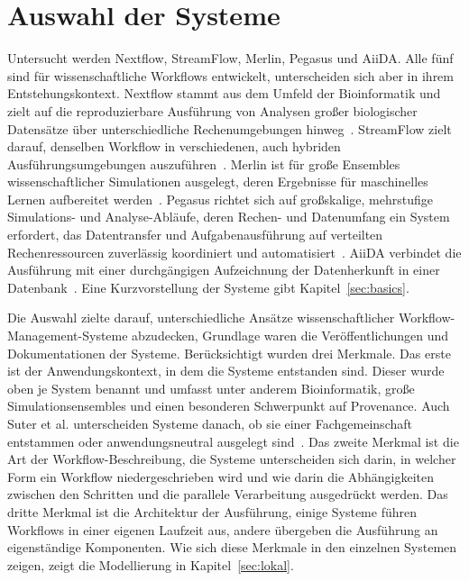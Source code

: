 \section{Auswahl der Systeme}
\label{sec:methodik:auswahl}
Untersucht werden Nextflow, StreamFlow, Merlin, Pegasus und AiiDA. Alle fünf sind für wissenschaftliche Workflows entwickelt, unterscheiden sich aber in ihrem Entstehungskontext. Nextflow stammt aus dem Umfeld der Bioinformatik und zielt auf die reproduzierbare Ausführung von Analysen großer biologischer Datensätze über unterschiedliche Rechenumgebungen hinweg~\cite[S.~316]{ditommaso2017nextflow}. StreamFlow zielt darauf, denselben Workflow in verschiedenen, auch hybriden Ausführungsumgebungen auszuführen~\cite[S.~1723]{colonnelli2021streamflow}. Merlin ist für große Ensembles wissenschaftlicher Simulationen ausgelegt, deren Ergebnisse für maschinelles Lernen aufbereitet werden~\cite[S.~255]{peterson2022merlin}. Pegasus richtet sich auf großskalige, mehrstufige Simulations- und Analyse-Abläufe, deren Rechen- und Datenumfang ein System erfordert, das Datentransfer und Aufgabenausführung auf verteilten Rechenressourcen zuverlässig koordiniert und automatisiert~\cite[S.~17]{deelman2015pegasus}. AiiDA verbindet die Ausführung mit einer durchgängigen Aufzeichnung der Datenherkunft in einer Datenbank~\cite[S.~1]{huber2020aiida}. Eine Kurzvorstellung der Systeme gibt Kapitel~\ref{sec:basics}.

\begin{sloppypar}
Die Auswahl zielte darauf, unterschiedliche Ansätze
wissenschaftlicher Workflow-Management-Systeme abzudecken, Grundlage
waren die Veröffentlichungen und Dokumentationen der Systeme.
Berücksichtigt wurden drei Merkmale. Das erste ist der Anwendungskontext, in dem die Systeme entstanden sind. Dieser wurde oben je System benannt und umfasst unter anderem Bioinformatik, große Simulationsensembles und einen besonderen Schwerpunkt auf Provenance. Auch Suter
et al. unterscheiden Systeme danach, ob sie einer Fachgemeinschaft
entstammen oder anwendungsneutral ausgelegt
sind~\cite[S.~4]{suter2026terminology}. Das zweite
Merkmal ist die Art der Workflow-Beschreibung, die Systeme
unterscheiden sich darin, in welcher Form ein Workflow
niedergeschrieben wird und wie darin die Abhängigkeiten zwischen den
Schritten und die parallele Verarbeitung ausgedrückt werden. Das
dritte Merkmal ist die Architektur der Ausführung, einige Systeme
führen Workflows in einer eigenen Laufzeit aus, andere übergeben die
Ausführung an eigenständige Komponenten. Wie sich diese Merkmale in den
einzelnen Systemen zeigen, zeigt die Modellierung in
Kapitel~\ref{sec:lokal}.
\end{sloppypar}

